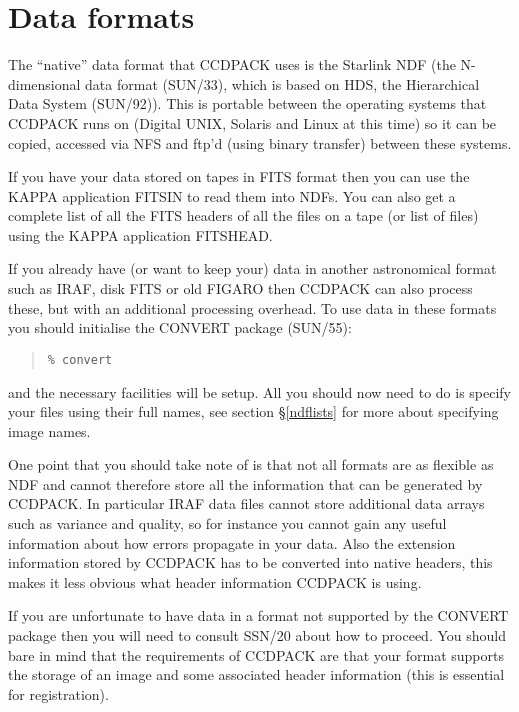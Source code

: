 \documentclass[twoside,11pt]{article}
\newcommand{\hyperref}[4]{#2\ref{#4}#3}
\newcommand{\xref}[3]{#1}
\newcommand{\xlabel}[1]{}
\renewcommand{\_}{\texttt{\symbol{95}}}
\newenvironment{myquote}{\begin{quote}\begin{small}}{\end{small}\end{quote}}
\begin{document}
\section{Data\label{datatypes} \xlabel{datatypes} formats}
The ``native'' data format that CCDPACK uses is the Starlink NDF (the
N-dimensional data format (\xref{SUN/33}{sun33}{}), which is based on
HDS, the Hierarchical Data System \xref{(SUN/92)}{sun92}{}).  This is
portable between the operating systems that CCDPACK runs on (Digital
UNIX, Solaris and Linux at this time) so it can be copied, accessed
via NFS and ftp'd (using binary transfer) between these systems.

If you have your data stored on tapes in FITS format then you can use
the \xref{KAPPA}{sun95}{} application \xref{FITSIN}{sun95}{FITSIN} to
read them into NDFs. You can also get a complete list of all the FITS
headers of all the files on a tape (or list of files) using the KAPPA
application \xref{FITSHEAD}{sun95}{FITSHEAD}.

If you already have (or want to keep your) data in another
astronomical format such as IRAF, disk FITS or old FIGARO then CCDPACK
can also process these, but with an additional processing overhead. To
use data in these formats you should initialise the CONVERT package
(\xref{SUN/55}{sun55}{}):
\begin{myquote}
\begin{verbatim}
% convert
\end{verbatim}
\end{myquote}
and the necessary facilities will be setup. All you should now need to
do is specify your files using their full names, see
\hyperref{later}{section \S}{}{ndflists} for more about specifying
image names.

One point that you should take note of is that not all formats are as
flexible as NDF and cannot therefore store all the information that
can be generated by CCDPACK. In particular IRAF data files cannot
store additional data arrays such as variance and quality, so for
instance you cannot gain any useful information about how errors
propagate in your data. Also the extension information stored by
CCDPACK has to be converted into native headers, this makes it less
obvious what header information CCDPACK is using.

If you are unfortunate to have data in a format not supported by the
CONVERT package then you will need to consult \xref{SSN/20}{ssn20}{}
about how to proceed. You should bare in mind that the requirements
of CCDPACK are that your format supports the storage of an image and
some associated header information (this is essential for registration).
\end{document}
